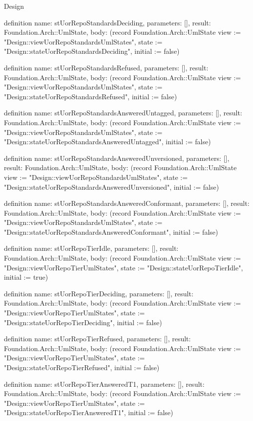 \begin{lexlean}{Design}
\begin{semanticmodule}
definition{
  name: stUorRepoStandardsDeciding,
  parameters: [],
  result: Foundation.Arch::UmlState,
  body: (record Foundation.Arch::UmlState {view := "Design::viewUorRepoStandardsUmlStates", state := "Design::stateUorRepoStandardsDeciding", initial := false})
}

definition{
  name: stUorRepoStandardsRefused,
  parameters: [],
  result: Foundation.Arch::UmlState,
  body: (record Foundation.Arch::UmlState {view := "Design::viewUorRepoStandardsUmlStates", state := "Design::stateUorRepoStandardsRefused", initial := false})
}

definition{
  name: stUorRepoStandardsAnsweredUntagged,
  parameters: [],
  result: Foundation.Arch::UmlState,
  body: (record Foundation.Arch::UmlState {view := "Design::viewUorRepoStandardsUmlStates", state := "Design::stateUorRepoStandardsAnsweredUntagged", initial := false})
}

definition{
  name: stUorRepoStandardsAnsweredUnversioned,
  parameters: [],
  result: Foundation.Arch::UmlState,
  body: (record Foundation.Arch::UmlState {view := "Design::viewUorRepoStandardsUmlStates", state := "Design::stateUorRepoStandardsAnsweredUnversioned", initial := false})
}

definition{
  name: stUorRepoStandardsAnsweredConformant,
  parameters: [],
  result: Foundation.Arch::UmlState,
  body: (record Foundation.Arch::UmlState {view := "Design::viewUorRepoStandardsUmlStates", state := "Design::stateUorRepoStandardsAnsweredConformant", initial := false})
}

definition{
  name: stUorRepoTierIdle,
  parameters: [],
  result: Foundation.Arch::UmlState,
  body: (record Foundation.Arch::UmlState {view := "Design::viewUorRepoTierUmlStates", state := "Design::stateUorRepoTierIdle", initial := true})
}

definition{
  name: stUorRepoTierDeciding,
  parameters: [],
  result: Foundation.Arch::UmlState,
  body: (record Foundation.Arch::UmlState {view := "Design::viewUorRepoTierUmlStates", state := "Design::stateUorRepoTierDeciding", initial := false})
}

definition{
  name: stUorRepoTierRefused,
  parameters: [],
  result: Foundation.Arch::UmlState,
  body: (record Foundation.Arch::UmlState {view := "Design::viewUorRepoTierUmlStates", state := "Design::stateUorRepoTierRefused", initial := false})
}

definition{
  name: stUorRepoTierAnsweredT1,
  parameters: [],
  result: Foundation.Arch::UmlState,
  body: (record Foundation.Arch::UmlState {view := "Design::viewUorRepoTierUmlStates", state := "Design::stateUorRepoTierAnsweredT1", initial := false})
}


\end{semanticmodule}
\end{lexlean}
